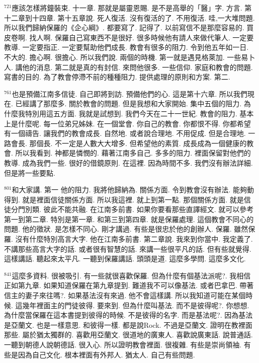\documentclass{book}
\begin{document}
$^{721}$應該怎樣將鐘裝束.
十一章.
那就是屬靈恩賜.
是不是高舉的「醫」字.
方言.
第十二章到十四章.
第十五章說.
死人復活.
沒有復活的了.
不用復活.
哇,一大堆問題.
所以我們歸納保羅的《企心綱》.
都要寫了.
記得了.
以前寫信不是那麼容易的.
買皮卷啊.
找人啊.
保羅自己寫東西不是很好.
很多時候他有請人來做代筆人.
一定要教導.
一定要指正.
一定要幫助他們成長.
教會有很多的阻力.
令到他五年如一日.
不大的.
擔心啊.
很擔心.
所以我們說.
兩個的時機.
第一就是遇見格萊加.
一些易卜人.
講他的消息.
第二就是真的有封信.
來問他很多.
一些信仰.
家庭和教會的問題.
寫書的目的.
為了教會停滯不前的種種阻力.
提供處理的原則和方案.
第二.

$^{761}$也是預備江南多信徒.
自己即將到訪.
預備他們的心.
這是第十六章.
所以我們現在.
已經講了那麼多.
關於教會的問題.
但是我想和大家開始.
集中五個的阻力.
為什麼我特別用這五方面.
我就是試想到.
我們今天在二十一世紀.
教會的阻力.
基本上是什麼呢.
每一位弟兄姊妹.
在一個堂會.
你自己的教會.
你都恨不得.
你都希望有一個禱告.
讓我們的教會成長.
自然地.
或者說合理地.
不用促成.
但是合理地.
一路會長.
那個長.
不一定是人數大大增多.
但希望他的素質.
成長成為一個健康的教會.
所以我看到.
神都是憐憫的.
藉著江南多自己.
多多的阻力.
裡面保留對他們的教導.
成為我們一些.
很好的借鏡原則.
在這裡.
因為時間不多.
我們沒有辦法詳細.
但是將一些要點.

$^{801}$和大家講.
第一 他的阻力.
我將他歸納為.
關係方面.
令到教會沒有辦法.
能夠動得到.
就是裡面信徒關係方面.
所以我這裡.
就上到第一點.
那個關係方面.
就是信徒分門別類.
彼此不能共融.
在江南多前書.
如果你要看那些直譯經文.
就可以參考第一到第二章.
特別是第一章.
和第三到第四章.
就是保羅處理.
這個教會不同心的問題.
他的徵狀.
是怎樣不同心.
剛才講過.
有些是很忠於他的創辦人.
保羅.
雖然保羅.
沒有什麼特別高言大字.
他在江南多前書.
第二章說.
我來到你當中.
我定義了.
不講那些高言大字的話.
或者很有智慧的話.
來講一些很平凡的話.
但有些就覺得.
這樣講話.
聽起來太平凡.
一聽到保羅講話.
頭頭是道.
這麼多學問.
這麼多文化.

$^{841}$這麼多資料.
很被吸引.
有一些就很喜歡保羅.
但為什麼有個基法派呢?.
我相信正如第九章.
如果知道保羅在第九章提到.
難道我不可以像基法.
或者巴拿巴.
帶著信主的妻子來往嗎?.
如果基法沒有來過.
他不會這樣講.
所以我知道可能在某個時候.
這幾年裡面主的門徒彼得.
要來到.
但為什麼叫基法.
而不是彼得呢?.
你想想.
為什麼當保羅在這本書提到彼得的時候.
不是彼得的名字.
而是基法呢?.
因為基法是亞蘭文.
也是一樣意思.
和彼得一樣.
都是說Rock.
不過是亞蘭文.
證明在教裡面那些.
屬於猶太獨群的.
喜歡用亞蘭文.
很道地的廣東人.
喜歡說廣東話.
說普通話.
一聽到朝德人說朝德話.
很入心.
所以證明教會裡面.
很複雜.
有些是崇尚領袖.
有些是因為自己文化.
根本裡面有外邦人.
猶太人.
自己有些問題.
\end{document}
